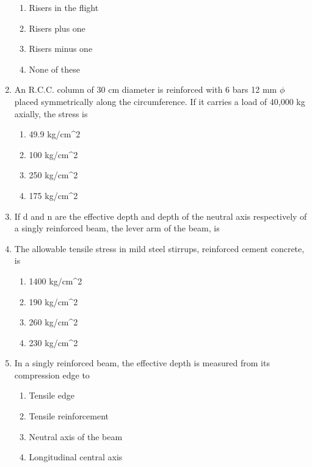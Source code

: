 \documentclass[11pt,a4paper]{article}
\begin{document}
\begin{enumerate}
\begin{enumerate}[label=\Alph*.]
\item{Risers in the flight}
\item{Risers plus one}
\item{Risers minus one}
\item{None of these}
\end{enumerate}
\item{An R.C.C. column of 30 cm diameter is reinforced with 6 bars 12 mm $\phi$ placed symmetrically along the circumference. If it carries a load of 40,000 kg axially, the stress is
}
\begin{enumerate}[label=\Alph*.]
\item{49.9 kg/cm\^{}2}
\item{100 kg/cm\^{}2}
\item{250 kg/cm\^{}2}
\item{175 kg/cm\^{}2}
\end{enumerate}
\item{If d and n are the effective depth and depth of the neutral axis respectively of a singly reinforced beam, the lever arm of the beam, is}
\\
\item{The allowable tensile stress in mild steel stirrups, reinforced cement concrete, is}
\begin{enumerate}[label=\Alph*.]
\item{1400 kg/cm\^{}2}
\item{190 kg/cm\^{}2}
\item{260 kg/cm\^{}2}
\item{230 kg/cm\^{}2}
\end{enumerate}
\item{In a singly reinforced beam, the effective depth is measured from its compression edge to}
\begin{enumerate}[label=\Alph*.]
\item{Tensile edge}
\item{Tensile reinforcement}
\item{Neutral axis of the beam}
\item{Longitudinal central axis}

\end{enumerate}
\end{enumerate}
\end{document}
